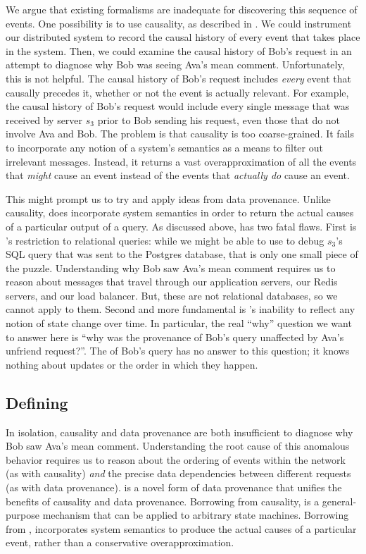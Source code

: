 We argue that existing formalisms are inadequate for discovering this
sequence of events. One possibility is to use causality, as described in
. We could instrument our distributed system to record the
causal history of every event that takes place in the system. Then, we could
examine the causal history of Bob's request in an attempt to diagnose why Bob
was seeing Ava's mean comment. Unfortunately, this is not helpful. The causal
history of Bob's request includes \emph{every} event that causally precedes it,
whether or not the event is actually relevant. For example, the causal history
of Bob's request would include every single message that was received by server
$s_3$ prior to Bob sending his request, even those that do not involve Ava and
Bob. The problem is that causality is too coarse-grained. It fails to
incorporate any notion of a system's semantics as a means to filter out
irrelevant messages. Instead, it returns a vast overapproximation of all the
events that \emph{might} cause an event instead of the events that
\emph{actually do} cause an event.

This might prompt us to try and apply ideas from data provenance. Unlike
causality, \whyprovenance{} does incorporate system semantics in order to
return the actual causes of a particular output of a query. As discussed
above, \whyprovenance{} has two fatal flaws. First is \whyprovenance{}'s
restriction to relational queries: while we might be able to use
\whyprovenance{} to debug $s_3$'s SQL query that was sent to the Postgres
database, that is only one small piece of the puzzle. Understanding why Bob
saw Ava's mean comment requires us to reason about messages that travel through
our application servers, our Redis servers, and our load balancer. But, these
are not relational databases, so we cannot apply \whyprovenance{} to them.
Second and more fundamental is \whyprovenance{}'s inability to reflect any
notion of state change over time. In particular, the real ``why'' question we
want to answer here is ``why was the provenance of Bob's query unaffected by
Ava's unfriend request?''. The \whyprovenance{} of Bob's query has no answer to
this question; it knows nothing about updates or the order in which they
happen.

\subsection{Defining \WatProvenance{}}
In isolation, causality and data provenance are both insufficient to diagnose
why Bob saw Ava's mean comment. Understanding the root cause of this anomalous
behavior requires us to reason about the ordering of events within the network
(as with causality) \emph{and} the precise data dependencies between different
requests (as with data provenance).
%
 is a novel form of data provenance that unifies the
benefits of causality and data provenance. Borrowing from causality,
\watprovenance{} is a general-purpose mechanism that can be applied to
arbitrary state machines. Borrowing from \whyprovenance{}, \watprovenance{}
incorporates system semantics to produce the actual causes of a particular
event, rather than a conservative overapproximation.

